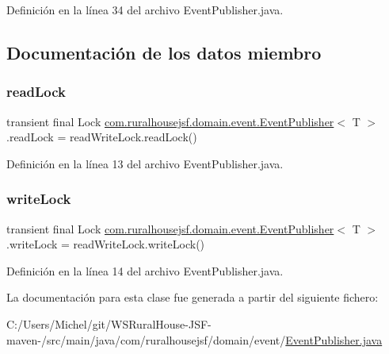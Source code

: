 Definición en la línea 34 del archivo Event\+Publisher.\+java.



\subsection{Documentación de los datos miembro}
\mbox{\label{classcom_1_1ruralhousejsf_1_1domain_1_1event_1_1_event_publisher_a5ffe504fad62f049d51a80fb912b97f5}} 
\subsubsection{\texorpdfstring{readLock}{readLock}}
{\footnotesize\ttfamily transient final Lock \mbox{\hyperlink{classcom_1_1ruralhousejsf_1_1domain_1_1event_1_1_event_publisher}{com.\+ruralhousejsf.\+domain.\+event.\+Event\+Publisher}}$<$ T $>$.read\+Lock = read\+Write\+Lock.\+read\+Lock()\hspace{0.3cm}{\ttfamily [protected]}}



Definición en la línea 13 del archivo Event\+Publisher.\+java.

\mbox{\label{classcom_1_1ruralhousejsf_1_1domain_1_1event_1_1_event_publisher_a1ed2aa95b3bceee1d543a0d0d7297171}} 
\subsubsection{\texorpdfstring{writeLock}{writeLock}}
{\footnotesize\ttfamily transient final Lock \mbox{\hyperlink{classcom_1_1ruralhousejsf_1_1domain_1_1event_1_1_event_publisher}{com.\+ruralhousejsf.\+domain.\+event.\+Event\+Publisher}}$<$ T $>$.write\+Lock = read\+Write\+Lock.\+write\+Lock()\hspace{0.3cm}{\ttfamily [protected]}}



Definición en la línea 14 del archivo Event\+Publisher.\+java.



La documentación para esta clase fue generada a partir del siguiente fichero\+:\begin{DoxyCompactItemize}
\item 
C\+:/\+Users/\+Michel/git/\+W\+S\+Rural\+House-\/\+J\+S\+F-\/maven-\//src/main/java/com/ruralhousejsf/domain/event/\mbox{\hyperlink{_event_publisher_8java}{Event\+Publisher.\+java}}\end{DoxyCompactItemize}
